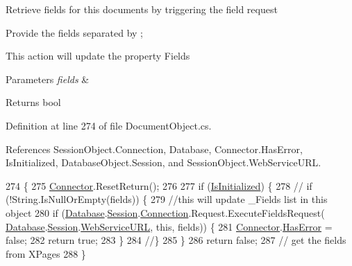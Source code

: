 Retrieve fields for this documents by triggering the field request 

Provide the fields separated by ;

This action will update the property \textquotesingle{}Fields\textquotesingle{}


\begin{DoxyParams}{Parameters}
{\em fields} & \\
\hline
\end{DoxyParams}
\begin{DoxyReturn}{Returns}
bool
\end{DoxyReturn}


Definition at line 274 of file Document\+Object.\+cs.



References Session\+Object.\+Connection, Database, Connector.\+Has\+Error, Is\+Initialized, Database\+Object.\+Session, and Session\+Object.\+Web\+Service\+U\+RL.


\begin{DoxyCode}
274                                          \{
275         \mbox{\hyperlink{class_connector}{Connector}}.ResetReturn();
276 
277         \textcolor{keywordflow}{if} (\mbox{\hyperlink{class_document_object_a3b2075b73f38d05091b69decc6ce7992}{IsInitialized}}) \{
278             \textcolor{comment}{// if (!String.IsNullOrEmpty(fields)) \{}
279             \textcolor{comment}{//this will update \_Fields list in this object}
280             \textcolor{keywordflow}{if} (\mbox{\hyperlink{class_document_object_a69d5338c9835f748490323d2950eed09}{Database}}.\mbox{\hyperlink{class_database_object_aa8484162b7d2a7c4c9426bca13c64c07}{Session}}.\mbox{\hyperlink{class_session_object_a014bdbf705a753540e19bfb53030c55c}{Connection}}.Request.ExecuteFieldsRequest(
      \mbox{\hyperlink{class_document_object_a69d5338c9835f748490323d2950eed09}{Database}}.\mbox{\hyperlink{class_database_object_aa8484162b7d2a7c4c9426bca13c64c07}{Session}}.\mbox{\hyperlink{class_session_object_a697c071c812fbf7ad1166b896fb44c16}{WebServiceURL}}, \textcolor{keyword}{this}, fields)) \{
281                 \mbox{\hyperlink{class_connector}{Connector}}.\mbox{\hyperlink{class_connector_a9365777a6b7b711b75bcfa6c4d53e989}{HasError}} = \textcolor{keyword}{false};
282                 \textcolor{keywordflow}{return} \textcolor{keyword}{true};
283             \}
284             \textcolor{comment}{//\}}
285         \}
286         \textcolor{keywordflow}{return} \textcolor{keyword}{false};
287         \textcolor{comment}{// get the fields from XPages}
288     \}
\end{DoxyCode}
\mbox{\label{class_document_object_a8e38704e02850b2480d29d184ae2c0e0}} 
